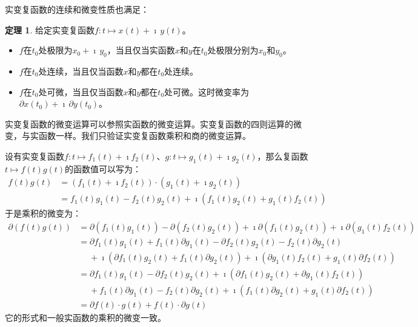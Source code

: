 \documentclass[12pt,UTF8]{ctexbook}
\theoremstyle{definition}
\newtheorem{tm}{定理}[section]
\theoremstyle{plain}
\begin{document}
实变复函数的连续和微变性质也满足：
\begin{tm}\label{tm:1-2-10}
    给定实变复函数$f: t\mapsto x(t) + \imath\, y(t)$。
    \begin{itemize}
        \item $f$在$t_0$处极限为$x_0 + \imath\, y_0$，当且仅当实函数$x$和$y$在$t_0$处极限分别为$x_0$和$y_0$。
        \item $f$在$t_0$处连续，当且仅当函数$x$和$y$都在$t_0$处连续。
        \item $f$在$t_0$处可微，当且仅当函数$x$和$y$都在$t_0$处可微。这时微变率为$\partial x(t_0)+ \imath\,\partial y(t_0)$。
    \end{itemize}
\end{tm}

实变复函数的微变运算可以参照实函数的微变运算。实变复函数的四则运算的微变，与实函数一样。我们只验证实变复函数乘积和商的微变运算。

设有实变复函数$f: t\mapsto f_1(t) + \imath f_2 (t)$、$g: t\mapsto g_1(t) + \imath g_2 (t)$，那么复函数$t\mapsto f(t) g(t)$的函数值可以写为：
\begin{align*}
    f(t) g(t) &= (f_1(t) + \imath f_2 (t))\cdot (g_1(t) + \imath g_2 (t)) \\
    &= f_1(t)g_1(t) - f_2 (t)g_2 (t) + \imath (f_1 (t) g_2 (t) + g_1(t) f_2 (t))
\end{align*}
于是乘积的微变为：
\begin{align*}
    \partial (f(t) g(t)) &= \partial (f_1(t)g_1(t)) - \partial (f_2 (t)g_2 (t)) + \imath \partial (f_1 (t) g_2 (t) ) + \imath \partial (g_1(t) f_2 (t)) \\
    &= \partial f_1(t)g_1(t) + f_1(t) \partial g_1(t) - \partial f_2 (t)g_2 (t) - f_2 (t) \partial g_2 (t) \\ 
    &\;\quad + \imath ( \partial f_1 (t) g_2 (t) + f_1 (t) \partial g_2 (t)) +   \imath (\partial g_1(t) f_2 (t) + g_1(t) \partial f_2 (t)) \\
    &= \partial f_1(t)g_1(t) - \partial f_2 (t)g_2 (t) + \imath ( \partial f_1 (t) g_2 (t) + \partial g_1(t) f_2 (t)) \\
    &\;\quad + f_1(t) \partial g_1(t) - f_2 (t) \partial g_2 (t) + \imath (f_1 (t) \partial g_2 (t) + g_1(t) \partial f_2 (t)) \\
    &= \partial f(t) \cdot g(t) + f(t) \cdot \partial g(t)
\end{align*}
它的形式和一般实函数的乘积的微变一致。
\end{document}
